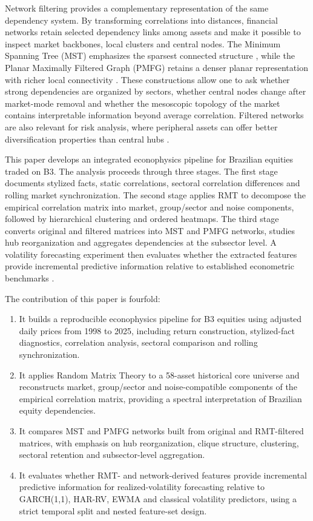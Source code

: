 Network filtering provides a complementary representation of the same dependency system. By transforming correlations into distances, financial networks retain selected dependency links among assets and make it possible to inspect market backbones, local clusters and central nodes. The Minimum Spanning Tree (MST) emphasizes the sparsest connected structure \cite{mantegna_1999_hierarchical}, while the Planar Maximally Filtered Graph (PMFG) retains a denser planar representation with richer local connectivity \cite{tumminello_2005_tool,tumminello_2010_correlation}. These constructions allow one to ask whether strong dependencies are organized by sectors, whether central nodes change after market-mode removal and whether the mesoscopic topology of the market contains interpretable information beyond average correlation. Filtered networks are also relevant for risk analysis, where peripheral assets can offer better diversification properties than central hubs \cite{pozzi_2013_spread,aste_2010_correlation}.

This paper develops an integrated econophysics pipeline for Brazilian equities traded on B3. The analysis proceeds through three stages. The first stage documents stylized facts, static correlations, sectoral correlation differences and rolling market synchronization. The second stage applies RMT to decompose the empirical correlation matrix into market, group/sector and noise components, followed by hierarchical clustering and ordered heatmaps. The third stage converts original and filtered matrices into MST and PMFG networks, studies hub reorganization and aggregates dependencies at the subsector level. A volatility forecasting experiment then evaluates whether the extracted features provide incremental predictive information relative to established econometric benchmarks \cite{bollerslev_1986_generalized,corsi_2009_simple,hansen_lunde_2005}.


The contribution of this paper is fourfold:
\begin{enumerate}
  \item It builds a reproducible econophysics pipeline for B3 equities using adjusted daily prices from 1998 to 2025, including return construction, stylized-fact diagnostics, correlation analysis, sectoral comparison and rolling synchronization.
  \item It applies Random Matrix Theory to a 58-asset historical core universe and reconstructs market, group/sector and noise-compatible components of the empirical correlation matrix, providing a spectral interpretation of Brazilian equity dependencies.
  \item It compares MST and PMFG networks built from original and RMT-filtered matrices, with emphasis on hub reorganization, clique structure, clustering, sectoral retention and subsector-level aggregation.
  \item It evaluates whether RMT- and network-derived features provide incremental predictive information for realized-volatility forecasting relative to GARCH(1,1), HAR-RV, EWMA and classical volatility predictors, using a strict temporal split and nested feature-set design.
\end{enumerate}

